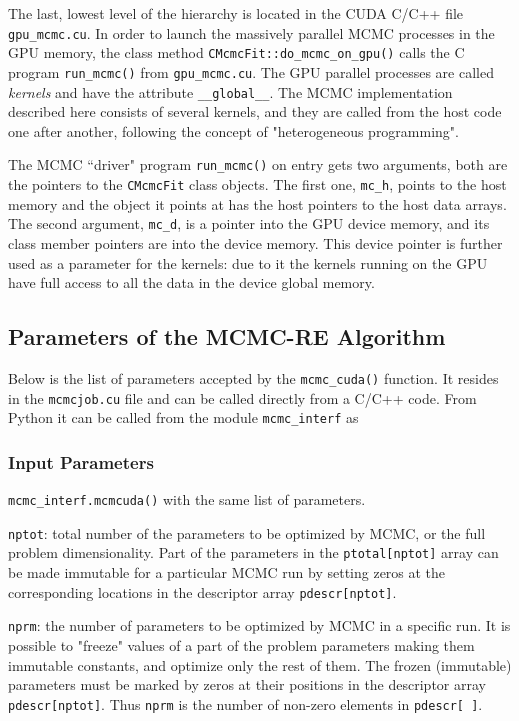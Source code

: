 \documentclass[preprint2]{aastex}
\begin{document}
The last, lowest level of the hierarchy is located in the CUDA C/C++ file \verb|gpu_mcmc.cu|. In order to launch the massively parallel MCMC processes in the GPU memory, the class method \verb|CMcmcFit::do_mcmc_on_gpu()| calls the C program \verb|run_mcmc()| from \verb|gpu_mcmc.cu|. The GPU parallel processes are called \emph{kernels} and have the attribute \verb|__global__|. The MCMC implementation described here consists of several kernels, and they are called from the host code one after another, following the concept of "heterogeneous programming". 

The MCMC ``driver" program \verb|run_mcmc()| on entry gets two arguments, both are the pointers to the \verb|CMcmcFit| class objects. The first one, \verb|mc_h|, points to the host memory and the object it points at has the host pointers to the host data arrays. The second argument, \verb|mc_d|, is a pointer into the GPU device memory, and its class member pointers are into the device memory. This device pointer is further used as a parameter for the kernels: due to it the kernels running on the GPU have full access to all the data in the device global memory.


\subsection{Parameters of the MCMC-RE Algorithm} \label{algparams}

Below is the list of parameters accepted by the \verb|mcmc_cuda()| function. 
It resides in the \verb|mcmcjob.cu| file and can be called directly from a C/C++ code. 
From Python it can be called from the module \verb|mcmc_interf| as \\

\subsubsection{Input Parameters}

\verb|mcmc_interf.mcmcuda()| with the same list of parameters.

\verb|nptot|: total number of the parameters to be optimized by MCMC, or
       the full problem dimensionality. Part of the parameters in the
       \verb|ptotal[nptot]| array can be made immutable for a particular MCMC run
       by setting zeros at the corresponding locations in the descriptor
       array \verb|pdescr[nptot]|.

\verb|nprm|: the number of parameters to be optimized by MCMC in a specific run.
      It is possible to "freeze" values of a part of the problem parameters
      making them immutable constants, and optimize only the rest of them.
      The frozen (immutable) parameters must be marked by zeros at their
      positions in the descriptor array \verb|pdescr[nptot]|. Thus \verb|nprm| is the
      number of non-zero elements in \verb|pdescr[ ]|.
\end{document}
